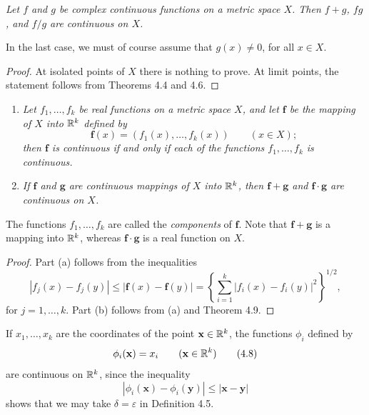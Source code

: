 \emph{Let $f$ and $g$ be complex continuous functions on a metric space $X$.
Then $f+g$, $fg$, and $f/g$ are continuous on $X$.}

In the last case, we must of course assume that $g(x) \ne 0$, for all
$x \in X$.

\begin{proof}
At isolated points of $X$ there is nothing to prove. At limit points, the
statement follows from Theorems 4.4 and 4.6.
\end{proof}

\begin{enumerate}[label=(\alph*), leftmargin=2.2em, itemsep=3pt, topsep=3pt]
  \item \emph{Let $f_1,\dots,f_k$ be real functions on a metric space $X$,
        and let $\mathbf{f}$ be the mapping of $X$ into $\mathbb{R}^k$ defined by}
        \begin{equation}
          \mathbf{f}(x) = (f_1(x),\dots,f_k(x)) \qquad (x \in X); \tag{4.7}
        \end{equation}
        \emph{then $\mathbf{f}$ is continuous if and only if each of the
        functions $f_1,\dots,f_k$ is continuous.}
  \item \emph{If $\mathbf{f}$ and $\mathbf{g}$ are continuous mappings of $X$
        into $\mathbb{R}^k$, then $\mathbf{f}+\mathbf{g}$ and
        $\mathbf{f}\cdot\mathbf{g}$ are continuous on $X$.}
\end{enumerate}
The functions $f_1,\dots,f_k$ are called the \emph{components} of
$\mathbf{f}$. Note that $\mathbf{f}+\mathbf{g}$ is a mapping into $\mathbb{R}^k$,
whereas $\mathbf{f}\cdot\mathbf{g}$ is a real function on $X$.

\begin{proof}
Part (a) follows from the inequalities
\[ |f_j(x)-f_j(y)| \le |\mathbf{f}(x)-\mathbf{f}(y)| =
   \left\{\sum_{i=1}^{k} |f_i(x)-f_i(y)|^2\right\}^{1/2}, \]
for $j = 1,\dots,k$. Part (b) follows from (a) and Theorem 4.9.
\end{proof}

If $x_1,\dots,x_k$ are the coordinates of the point $\mathbf{x} \in \mathbb{R}^k$,
the functions $\phi_i$ defined by
\begin{equation}
  \phi_i(\mathbf{x}) = x_i \qquad (\mathbf{x} \in \mathbb{R}^k) \tag{4.8}
\end{equation}
are continuous on $\mathbb{R}^k$, since the inequality
\[ |\phi_i(\mathbf{x})-\phi_i(\mathbf{y})| \le |\mathbf{x}-\mathbf{y}| \]
shows that we may take $\delta = \varepsilon$ in Definition 4.5.


